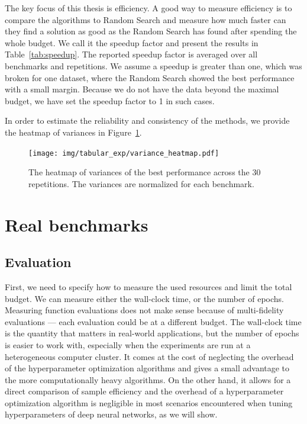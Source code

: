The key focus of this thesis is efficiency. A good way to measure efficiency is to compare the algorithms to Random Search and measure how much faster can they find a solution as good as the Random Search has found after spending the whole budget. We call it the speedup factor and present the results in Table~\ref{tab:speedup}. The reported speedup factor is averaged over all benchmarks and repetitions. We assume a speedup is greater than one, which was broken for one dataset, where the Random Search showed the best performance with a small margin. Because we do not have the data beyond the maximal budget, we have set the speedup factor to 1 in such cases.




In order to estimate the reliability and consistency of the methods, we provide the heatmap of variances in Figure~\ref{fig:heatmap}. 

\begin{figure}
    \centering
    \texttt{[image: img/tabular\_exp/variance\_heatmap.pdf]}
    \caption{The heatmap of variances of the best performance across the 30 repetitions. The variances are normalized for each benchmark.}
    \label{fig:heatmap}
\end{figure}


\section{Real benchmarks}


\subsection{Evaluation}

First, we need to specify how to measure the used resources and limit the total budget. We can measure either the wall-clock time, or the number of epochs. Measuring function evaluations does not make sense because of multi-fidelity evaluations --- each evaluation could be at a different budget. The wall-clock time is the quantity that matters in real-world applications, but the number of epochs is easier to work with, especially when the experiments are run at a heterogeneous computer cluster. It comes at the cost of neglecting the overhead of the hyperparameter optimization algorithms and gives a small advantage to the more computationally heavy algorithms. On the other hand, it allows for a direct comparison of sample efficiency and the overhead of a hyperparameter optimization algorithm is negligible in most scenarios encountered when tuning hyperparameters of deep neural networks, as we will show.


